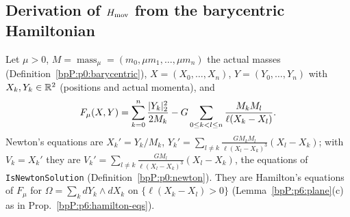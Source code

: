 \subsection{Derivation of $H_{\rm mov}$ from the barycentric Hamiltonian}\label{bpP:p6:derivation}

\begin{definition}\label{bpP:p6:nbody}
Let $\mu>0$, $M=\operatorname{mass}_\mu=(m_0,\mu m_1,\dots,\mu m_n)$ the actual masses (Definition~\ref{bpP:p0:barycentric}), $X=(X_0,\dots,X_n)$, $Y=(Y_0,\dots,Y_n)$ with $X_k,Y_k\in\mathbb{R}^2$ (positions and actual momenta), and
\[F_\mu(X,Y)=\sum_{k=0}^n\frac{\lvert Y_k\rvert_2^2}{2M_k}-G\sum_{0\le k<l\le n}\frac{M_kM_l}{\ell(X_k-X_l)}.\]
Newton's equations are $X_k'=Y_k/M_k$, $Y_k'=\sum_{l\ne k}\frac{GM_kM_l}{\ell(X_l-X_k)^3}(X_l-X_k)$; with $V_k=X_k'$ they are $V_k'=\sum_{l\ne k}\frac{GM_l}{\ell(X_l-X_k)^3}(X_l-X_k)$, the equations of \texttt{IsNewtonSolution} (Definition~\ref{bpP:p0:newton}). They are Hamilton's equations of $F_\mu$ for $\Omega=\sum_kdY_k\wedge dX_k$ on $\{\ell(X_k-X_l)>0\}$ (Lemma~\ref{bpP:p6:plane}(c) as in Prop.~\ref{bpP:p6:hamilton-eqs}).
\end{definition}

